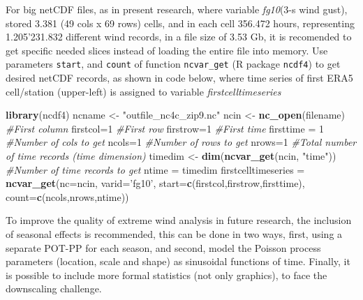 \documentclass[12pt,oneside]{reedthesis}
\newenvironment{Shaded}{\begin{snugshade}}{\end{snugshade}}
\newcommand{\CommentTok}[1]{\textcolor[rgb]{0.56,0.35,0.01}{\textit{#1}}}
\newcommand{\DataTypeTok}[1]{\textcolor[rgb]{0.13,0.29,0.53}{#1}}
\newcommand{\DecValTok}[1]{\textcolor[rgb]{0.00,0.00,0.81}{#1}}
\newcommand{\KeywordTok}[1]{\textcolor[rgb]{0.13,0.29,0.53}{\textbf{#1}}}
\newcommand{\NormalTok}[1]{#1}
\newcommand{\StringTok}[1]{\textcolor[rgb]{0.31,0.60,0.02}{#1}}
\begin{document}
For big netCDF files, as in present research, where variable \emph{fg10}(3-s wind gust), stored 3.381 (49 cols x 69 rows) cells, and in each cell 356.472 hours, representing 1.205'231.832 different wind records, in a file size of 3.53 Gb, it is recomended to get specific needed slices instead of loading the entire file into memory. Use parameters \texttt{start}, and \texttt{count} of function \texttt{ncvar\_get} (R package \texttt{ncdf4}) to get desired netCDF records, as shown in code below, where time series of first ERA5 cell/station (upper-left) is assigned to variable \emph{firstcelltimeseries}

\scriptsize
\begin{Shaded}
\begin{Highlighting}[]
    \KeywordTok{library}\NormalTok{(ncdf4)}
\NormalTok{    ncname <-}\StringTok{ "outfile_nc4c_zip9.nc"}
\NormalTok{    ncin <-}\StringTok{ }\KeywordTok{nc_open}\NormalTok{(filename)}
    \CommentTok{#First column}
\NormalTok{      firstcol=}\DecValTok{1}
    \CommentTok{#First row}
\NormalTok{      firstrow=}\DecValTok{1}
    \CommentTok{#First time}
\NormalTok{      firsttime =}\StringTok{ }\DecValTok{1}
    \CommentTok{#Number of cols to get}
\NormalTok{      ncols=}\DecValTok{1}
    \CommentTok{#Number of rows to get}
\NormalTok{      nrows=}\DecValTok{1}
    \CommentTok{#Total number of time records (time dimension)}
\NormalTok{      timedim <-}\StringTok{  }\KeywordTok{dim}\NormalTok{(}\KeywordTok{ncvar_get}\NormalTok{(ncin, }\StringTok{"time"}\NormalTok{))}
    \CommentTok{#Number of time records to get}
\NormalTok{      ntime =}\StringTok{ }\NormalTok{timedim}
\NormalTok{      firstcelltimeseries =}\StringTok{ }\KeywordTok{ncvar_get}\NormalTok{(}\DataTypeTok{nc=}\NormalTok{ncin, }\DataTypeTok{varid=}\StringTok{'fg10'}\NormalTok{, }\DataTypeTok{start=}\KeywordTok{c}\NormalTok{(firstcol,firstrow,firsttime), }
                                    \DataTypeTok{count=}\KeywordTok{c}\NormalTok{(ncols,nrows,ntime))}
\end{Highlighting}
\end{Shaded}
\normalsize

To improve the quality of extreme wind analysis in future research, the inclusion of seasonal effects is recommended, this can be done in two ways, first, using a separate POT-PP for each season, and second, model the Poisson process parameters (location, scale and shape) as sinusoidal functions of time. Finally, it is possible to include more formal statistics (not only graphics), to face the downscaling challenge.
\end{document}
